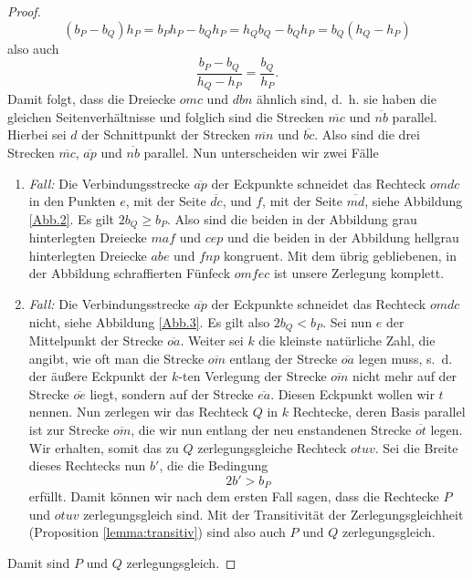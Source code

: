 \documentclass[11pt,titlepage]{article}
\theoremstyle{definition}
\theoremstyle{remark}
\begin{document}
\begin{proof}
		\[ (b_P-b_Q)h_P=b_P h_P-b_Q h_P=h_Qb_Q-b_Qh_P=b_Q(h_Q-h_P) \]
		also auch
		\[\frac{b_P-b_Q}{h_Q-h_P}=\frac{b_Q}{h_P}. \]
		Damit folgt, dass die Dreiecke $omc$ und $dbn$ ähnlich sind, d.~h. 
		sie haben die gleichen Seitenverhältnisse und folglich sind die Strecken $\overline{mc}$ 
		und $\overline{nb}$ parallel. Hierbei sei $d$ der Schnittpunkt der Strecken $\overline{mn}$ und 
		$\overline{bc}$. Also sind die drei Strecken $\overline{mc}$, $\overline{ap}$ und $\overline{nb}$ 
		parallel. Nun unterscheiden wir zwei Fälle
		\begin{enumerate}
			\item \textsl{Fall:} Die Verbindungsstrecke $\overline{ap}$ der Eckpunkte schneidet das 
			Rechteck $omdc$ in den Punkten $e$, mit der Seite $\overline{dc}$, 
			und $f$, mit der Seite $\overline{md}$, siehe Abbildung \ref{Abb.2}. 
			Es gilt $2b_Q\geq b_P$.
			Also sind die beiden in der Abbildung grau hinterlegten Dreiecke $maf$ und $cep$ und die beiden 
			in der Abbildung hellgrau hinterlegten Dreiecke $abe$ und $fnp$ kongruent. Mit dem übrig gebliebenen, 
			in der Abbildung schraffierten Fünfeck $omfec$ ist unsere Zerlegung komplett.
			
			\item \textsl{Fall:} Die Verbindungsstrecke $\overline{ap}$ der Eckpunkte schneidet das 
			Rechteck $omdc$ nicht, siehe Abbildung \ref{Abb.3}. 
			Es gilt also $2b_Q<b_P$. Sei nun $e$ der Mittelpunkt der Strecke $\overline{oa}$. Weiter sei $k$ die 
			kleinste natürliche Zahl, die angibt, wie oft man die Strecke $\overline{om}$ entlang der Strecke $\overline{oa}$ 
			legen muss, s.~d. der äußere Eckpunkt der $k$-ten Verlegung der Strecke 
			$\overline{om}$ nicht mehr auf der Strecke $\overline{oe}$ liegt, 
			sondern auf der Strecke $\overline{ea}$. Diesen Eckpunkt wollen 
			wir $t$ nennen. 
			Nun zerlegen wir das Rechteck $Q$ in $k$ Rechtecke, deren 
			Basis parallel ist zur Strecke $\overline{om}$, die wir nun entlang der neu enstandenen Strecke 
			$\overline{ot}$ legen. Wir erhalten, somit das zu $Q$ zerlegungsgleiche Rechteck $otuv$. 
			Sei die Breite dieses Rechtecks nun $b'$, die die Bedingung
			\[ 2b'>b_P \]
			erfüllt. Damit können wir nach dem ersten Fall sagen, dass die Rechtecke $P$ und $otuv$ 
			zerlegungsgleich sind. Mit der Transitivität der 
			Zerlegungsgleichheit (Proposition \ref{lemma:transitiv}) sind 
			also auch $P$ und $Q$ zerlegungsgleich.
		\end{enumerate}
		Damit sind $P$ und $Q$ zerlegungsgleich.
	\end{proof}
	
\end{document}
